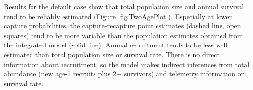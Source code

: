 \documentclass[
]{krantz}
\makeatletter
\newenvironment{Shaded}{\begin{snugshade}}{\end{snugshade}}
\newcommand{\AttributeTok}[1]{\textcolor[rgb]{0.27,0.27,0.27}{#1}}
\newcommand{\CommentTok}[1]{\textcolor[rgb]{0.37,0.37,0.37}{\textit{#1}}}
\newcommand{\DecValTok}[1]{\textcolor[rgb]{0.06,0.06,0.06}{#1}}
\newcommand{\FunctionTok}[1]{\textcolor[rgb]{0.27,0.27,0.27}{\textbf{#1}}}
\newcommand{\NormalTok}[1]{#1}
\newcommand{\OtherTok}[1]{\textcolor[rgb]{0.37,0.37,0.37}{#1}}
\newcommand{\SpecialCharTok}[1]{\textcolor[rgb]{0.43,0.43,0.43}{\textbf{#1}}}
\newcommand{\StringTok}[1]{\textcolor[rgb]{0.5,0.5,0.5}{#1}}
\newenvironment{kframe}{%
\medskip{}
\setlength{\fboxsep}{.8em}
 \def\at@end@of@kframe{}%
 \ifinner\ifhmode%
  \def\at@end@of@kframe{\end{minipage}}%
  \begin{minipage}{\columnwidth}%
 \fi\fi%
 \def\FrameCommand##1{\hskip\@totalleftmargin \hskip-\fboxsep
 \colorbox{shadecolor}{##1}\hskip-\fboxsep
     \hskip-\linewidth \hskip-\@totalleftmargin \hskip\columnwidth}%
 \MakeFramed {\advance\hsize-\width
   \@totalleftmargin\z@ \linewidth\hsize
   \@setminipage}}%
 {\par\unskip\endMakeFramed%
 \at@end@of@kframe}
\renewenvironment{Shaded}{\begin{kframe}}{\end{kframe}}
\makeatother
\begin{document}
\begin{Shaded}
\end{Shaded}

Results for the default case show that total population size and annual survival tend to be reliably estimated (Figure \ref{fig:TwoAgePlot}). Especially at lower capture probabilities, the capture-recapture point estimates (dashed line, open squares) tend to be more variable than the population estimates obtained from the integrated model (solid line). Annual recruitment tends to be less well estimated than total population size or survival rate. There is no direct information about recruitment, so the model makes indirect inferences from total abundance (new age-1 recruits plus 2+ survivors) and telemetry information on survival rate.
\end{document}

